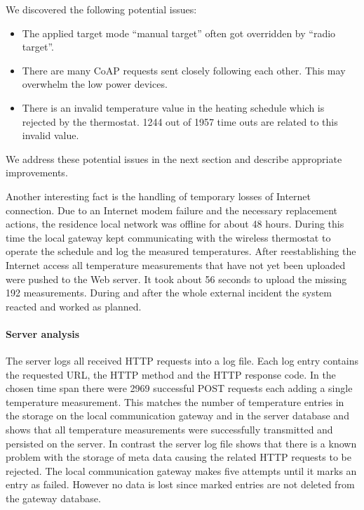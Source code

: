 We discovered the following potential issues:
\begin{itemize}
	\item The applied target mode ``manual target'' often got overridden by ``radio target''.
	\item There are many CoAP requests sent closely following each other. This may overwhelm the low power devices.
	\item There is an invalid temperature value in the heating schedule which is rejected by the thermostat. 1244 out of 1957 time outs are related to this invalid value.
\end{itemize}

We address these potential issues in the next section and describe appropriate improvements.

Another interesting fact is the handling of temporary losses of Internet connection.
Due to an Internet modem failure and the necessary replacement actions, the residence local network was offline for about 48 hours.
During this time the local gateway kept communicating with the wireless thermostat to operate the schedule and log the measured temperatures.
After reestablishing the Internet access all temperature measurements that have not yet been uploaded were pushed to the Web server.
It took about 56 seconds to upload the missing 192 measurements.
During and after the whole external incident the system reacted and worked as planned.

\paragraph{Server analysis}


The server logs all received HTTP requests into a log file.
Each log entry contains the requested URL, the HTTP method and the HTTP response code.
In the chosen time span there were 2969 successful POST requests each adding a single temperature measurement.
This matches the number of temperature entries in the storage on the local communication gateway and in the server database and shows that all temperature measurements were successfully transmitted and persisted on the server.
In contrast the server log file shows that there is a known problem with the storage of meta data causing the related HTTP requests to be rejected.
The local communication gateway makes five attempts until it marks an entry as failed.
However no data is lost since marked entries are not deleted from the gateway database.



